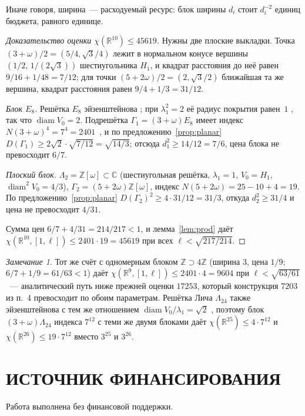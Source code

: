\documentclass{article}
\theoremstyle{plain}
\theoremstyle{remark}
\newtheorem{remark}{Замечание}
\newcommand{\R}{\mathbb{R}}
\newcommand{\Z}{\mathbb{Z}}
\newcommand{\CC}{\mathbb{C}}
\newcommand{\diam}{\operatorname{diam}}
\begin{document}
Иначе говоря, ширина~--- расходуемый ресурс: блок ширины $d_i$ стоит
$d_i^{-2}$ единиц бюджета, равного единице.

\begin{proof}[Доказательство оценки $\chi(\R^{10})\le45619$]
Нужны две плоские выкладки. Точка $(3+\omega)/2=(5/4,\sqrt3/4)$ лежит в
нормальном конусе вершины $(1/2,\,1/(2\sqrt3))$ шестиугольника $H_1$, и
квадрат расстояния до неё равен $9/16+1/48=7/12$; для точки
$(5+2\omega)/2=(2,\sqrt3/2)$ ближайшая та же вершина, квадрат расстояния
равен $9/4+1/3=31/12$.

\emph{Блок $E_8$.} Решётка $E_8$ эйзенштейнова \cite{ABPR,ConwaySloane};
при $\lambda_1^2=2$ её радиус покрытия равен~$1$ \cite{ConwaySloane}, так
что $\diam V_0=2$. Подрешётка $\Gamma_1=(3+\omega)E_8$ имеет индекс
$N(3+\omega)^4=7^4=2401$~\cite{ABPR}, и по предложению~\ref{prop:planar}
$D(\Gamma_1)\ge2\sqrt2\cdot\sqrt{7/12}=\sqrt{14/3}$; отсюда
$d_1^2\ge14/12=7/6$, цена блока не превосходит $6/7$.

\emph{Плоский блок.} $\Lambda_2=\Z[\omega]\subset\CC$ (шестиугольная
решётка, $\lambda_1=1$, $V_0=H_1$, $\diam^2V_0=4/3$),
$\Gamma_2=(5+2\omega)\Z[\omega]$, индекс $N(5+2\omega)=25-10+4=19$. По
предложению~\ref{prop:planar} $D(\Gamma_2)^2\ge4\cdot31/12=31/3$, откуда
$d_2^2\ge31/4$ и цена не превосходит $4/31$.

Сумма цен $6/7+4/31=214/217<1$, и лемма~\ref{lem:prod} даёт
$\chi(\R^{10},[1,\ell])\le2401\cdot19=45619$ при всех $\ell<\sqrt{217/214}$.
\end{proof}

\begin{remark}
Тот же счёт с одномерным блоком $\Z\supset4\Z$ (ширина $3$, цена $1/9$;
$6/7+1/9=61/63<1$) даёт $\chi(\R^9,[1,\ell])\le2401\cdot4=9604$ при
$\ell<\sqrt{63/61}$~--- аналитический путь ниже прежней оценки $17253$,
который конструкция $7203$ из п.~4 превосходит по обоим параметрам. Решётка
Лича $\Lambda_{24}$ также эйзенштейнова с тем же отношением
$\diam V_0/\lambda_1=\sqrt2$ \cite{ConwaySloane}, поэтому блок
$(3+\omega)\Lambda_{24}$ индекса $7^{12}$ \cite{ABPR} с теми же двумя
блоками даёт $\chi(\R^{25})\le4\cdot7^{12}$ и $\chi(\R^{26})\le19\cdot7^{12}$
вместо $3^{25}$ и $3^{26}$.
\end{remark}

\section*{ИСТОЧНИК ФИНАНСИРОВАНИЯ}

Работа выполнена без финансовой поддержки.
\end{document}
